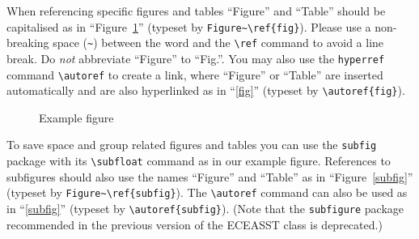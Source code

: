 \documentclass{eceasst}
\begin{document}
When referencing specific figures and tables ``Figure'' and ``Table'' should
be capitalised as in ``Figure~\ref{fig}'' (typeset by \verb|Figure~\ref{fig}|).
Please use a non-breaking space (\verb|~|) between the word and the \verb|\ref|
command to avoid a line break.
Do \emph{not} abbreviate ``Figure'' to ``Fig.''.
You may also use the \verb|hyperref| command \verb|\autoref| to create
a link, where ``Figure'' or ``Table'' are inserted automatically and are also
hyperlinked as in ``\autoref{fig}'' (typeset by \verb|\autoref{fig}|).
\begin{figure}
\centering
{}\quad
{}
\caption{Example figure}\label{fig}
\end{figure}

To save space and group related figures and tables you can use the
\verb|subfig| package with its \verb|\subfloat| command as in our example
figure.
References to subfigures should also use the names ``Figure'' and ``Table'' as
in ``Figure~\ref{subfig}'' (typeset by \verb|Figure~\ref{subfig}|).
The \verb|\autoref| command can also be used as in ``\autoref{subfig}''
(typeset by \verb|\autoref{subfig}|).
(Note that the \verb|subfigure| package recommended in the previous version
of the ECEASST class is deprecated.)
\end{document}
